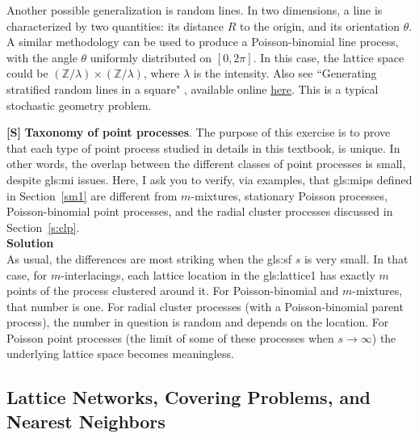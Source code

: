 \documentclass[10pt]{article}
\begin{document}
\begin{Exercise}
Another possible generalization is \textcolor{index}{random lines}. In two dimensions, a line is characterized by two quantities: 
its distance $R$ to the origin, and its orientation $\theta$. A similar methodology can be used to produce a Poisson-binomial line process, with the angle $\theta$ uniformly distributed on
$[0, 2\pi]$.  In this case, the lattice space could be $(\mathbb{Z}/\lambda) \times (\mathbb{Z}/\lambda)$, where $\lambda$ is the intensity. Also see ``Generating stratified random lines in a square" \cite{line12}, available online \href{https://jcgt.org/published/0006/02/03/}{here}.
This is a typical \textcolor{index}{stochastic geometry} problem.

\end{Exercise}

\begin{Exercise}\label{exercisec1}
{\bf [S]}  {\bf Taxonomy of point processes}. The purpose of this exercise is to prove that each type of point process studied in details in this textbook, is unique. In other words, the overlap between the different classes of point processes is small, despite \gls{gls:mi} issues. Here, I ask you to verify, via examples, that \glspl{gls:mip} defined in Section~\ref{sm1} are different from \textcolor{index}{$m$-mixtures}, stationary Poisson processes, Poisson-binomial point processes, and the radial cluster processes discussed in Section~\ref{s:clp}.
\vspace{1ex} \\
{\bf Solution} \vspace{1ex} \\
As usual, the differences are most striking when the \gls{gls:sf} $s$ is very small. In that case, for $m$-interlacings, each lattice
location in the \gls{gls:lattice1} has exactly $m$ points of the process clustered around it. For Poisson-binomial and $m$-mixtures,
that number is one. For radial cluster processes (with a Poisson-binomial parent process), the number in question is random and depends on the location. 
For Poisson point processes (the limit of some of these processes when $s\rightarrow\infty$) the underlying lattice space becomes meaningless.
\end{Exercise}

\subsection{Lattice Networks, Covering Problems, and Nearest Neighbors}\label{lattnn}
\end{document}
